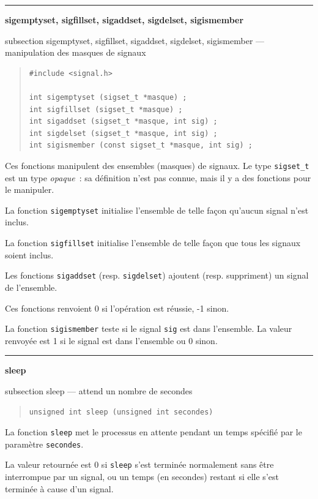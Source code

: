 \documentclass [twoside] {report}
\newcommand {\primitive} [1]
    {
	\phantomsection
	{\large \textbf {#1}}
	\addcontentsline {toc} {subsection} {#1}
    }
\newcommand {\separation}
    {
	\vspace {5mm}
	\nopagebreak
	\hrule
    }
\begin{document}
\separation 
\primitive {sigemptyset, sigfillset, sigaddset, sigdelset, sigismember} ---
manipulation des masques de signaux
    \label {sigsetopts}

\begin {quote}
\begin {verbatim}
#include <signal.h>

int sigemptyset (sigset_t *masque) ;
int sigfillset (sigset_t *masque) ;
int sigaddset (sigset_t *masque, int sig) ;
int sigdelset (sigset_t *masque, int sig) ;
int sigismember (const sigset_t *masque, int sig) ;
\end{verbatim}
\end {quote}

Ces fonctions manipulent des ensembles (masques) de signaux.  Le type
\texttt {sigset\_t} est un type \emph {opaque}~:  sa définition n'est pas
connue, mais il y a des fonctions pour le manipuler.

La fonction \texttt {sigemptyset} initialise l'ensemble de telle façon
qu'aucun signal n'est inclus.

La fonction \texttt {sigfillset} initialise l'ensemble de telle façon que
tous les signaux soient inclus.

Les fonctions \texttt {sigaddset} (resp. \texttt {sigdelset}) ajoutent
(resp. suppriment) un signal de l'ensemble.

Ces fonctions renvoient 0 si l'opération est réussie, -1 sinon.

La fonction \texttt {sigismember} teste si le signal \texttt {sig} est dans
l'ensemble. La valeur renvoyée est 1 si le signal est dans l'ensemble
ou 0 sinon.



\separation 
\primitive {sleep} --- attend un nombre de secondes

\begin {quote}
\begin {verbatim}
unsigned int sleep (unsigned int secondes)
\end{verbatim}
\end {quote}

La fonction \texttt {sleep} met le processus en attente pendant un temps
spécifié par le paramètre \texttt {secondes}.

La valeur retournée est 0 si \texttt {sleep} s'est terminée normalement sans
être interrompue par un signal, ou un temps (en secondes) restant
si elle s'est terminée à cause d'un signal.
\end{document}

